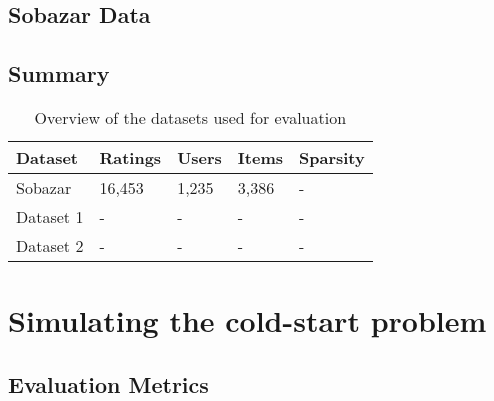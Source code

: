 \subsection{Sobazar Data}


\subsection{Summary}



\begin{table}[H]
    \centering
    \begin{tabular}{|l|l|l|l|l|}
    \hline
	Dataset		& 	Ratings & 	Users	& 	Items 	& 	Sparsity 	\\ \hline
	Sobazar 	& 	16,453  & 	1,235	&	3,386	&	-			\\ \hline
	Dataset 1 	& 	-  		& 	-		&	-		&	-			\\ \hline
	Dataset 2 	& 	-  		& 	-		&	-		&	-			\\ \hline
    \end{tabular}
    \label{table:datasets}
    \caption [Overview of the datasets used for evaluation]{Overview of the datasets used for evaluation}
\end{table}


\section{Simulating the cold-start problem}



\subsection{Evaluation Metrics}